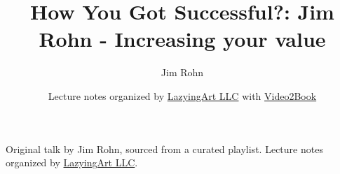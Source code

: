 \documentclass[11pt,oneside]{book}
\begin{document}
\frontmatter
\title{How You Got Successful?: Jim Rohn - Increasing your value}
\author{Jim Rohn}
\date{Lecture notes organized by \href{https://lazying.art}{LazyingArt LLC} with \href{https://github.com/lachlanchen/Video2Book}{Video2Book}}
\maketitle
\begin{center}
\small Original talk by Jim Rohn, sourced from a curated playlist. Lecture notes organized by \href{https://lazying.art}{LazyingArt LLC}.
\end{center}
\clearpage
\mainmatter

\end{document}
